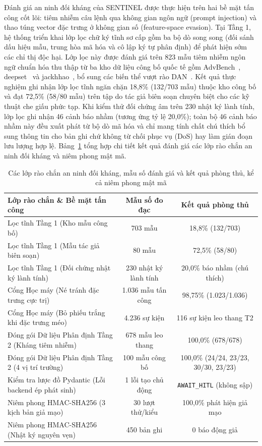 Đánh giá an ninh đối kháng của SENTINEL được thực hiện trên hai bề mặt tấn công cốt lõi: tiêm nhiễm câu lệnh qua không gian ngôn ngữ (prompt injection) và thao túng vector đặc trưng ở không gian số (feature-space evasion). Tại Tầng 1, hệ thống triển khai lớp lọc chữ ký tĩnh sơ cấp gồm ba bộ dò song song (đối sánh dấu hiệu mẫu, trung hòa mã hóa và cô lập ký tự phân định) để phát hiện sớm các chỉ thị độc hại. Lớp lọc này được đánh giá trên 823 mẫu tiêm nhiễm ngôn ngữ chuẩn hóa thu thập từ ba kho dữ liệu công bố quốc tế gồm AdvBench~\cite{advbench2023}, deepset~\cite{deepset2023} và jackhhao~\cite{jackhhao2023}, bổ sung các biến thể vượt rào DAN~\cite{shen2024dan}. Kết quả thực nghiệm ghi nhận lớp lọc tĩnh ngăn chặn 18,8\% (132/703 mẫu) thuộc kho công bố và đạt 72,5\% (58/80 mẫu) trên tập do tác giả biên soạn chuyên biệt cho các kỹ thuật che giấu phức tạp. Khi kiểm thử đối chứng âm trên 230 nhật ký lành tính, lớp lọc ghi nhận 46 cảnh báo nhầm (tương ứng tỷ lệ 20,0\%); toàn bộ 46 cảnh báo nhầm này đều xuất phát từ bộ dò mã hóa và chỉ mang tính chất chú thích bổ sung thông tin cho bản ghi chứ không từ chối phục vụ (DoS) hay làm gián đoạn lưu lượng hợp lệ. Bảng~\ref{tab:rq2_security} tổng hợp chi tiết kết quả đánh giá các lớp rào chắn an ninh đối kháng và niêm phong mật mã.

\begin{table}[htbp]
\centering
\caption[Kết quả đánh giá các lớp rào chắn an ninh đối kháng]{Các lớp rào chắn an ninh đối kháng, mẫu số đánh giá và kết quả phòng thủ, kể cả niêm phong mật mã}
\label{tab:rq2_security}
\footnotesize
\setlength{\tabcolsep}{4pt}
\begin{tabularx}{\textwidth}{>{\raggedright\arraybackslash}X c c}
\toprule
\textbf{Lớp rào chắn \& Bề mặt tấn công} & \textbf{Mẫu số đo đạc} & \textbf{Kết quả phòng thủ} \\
\midrule
Lọc tĩnh Tầng 1 (Kho mẫu công bố) & 703 mẫu & 18,8\% (132/703) \\
Lọc tĩnh Tầng 1 (Mẫu tác giả biên soạn) & 80 mẫu & 72,5\% (58/80) \\
Lọc tĩnh Tầng 1 (Đối chứng nhật ký lành tính) & 230 nhật ký lành tính & 20,0\% báo nhầm (chú thích) \\
Cổng Học máy (Né tránh đặc trưng cực trị) & 1.036 mẫu tấn công & 98,75\% (1.023/1.036) \\
Cổng Học máy (Bỏ phiếu trắng khi đặc trưng méo) & 4.236 sự kiện & 116 sự kiện leo thang T2 \\
Đóng gói Dữ liệu Phân định Tầng 2 (Kháng tiêm nhiễm) & 678 mẫu leo thang & 100,0\% (678/678) \\
Đóng gói Dữ liệu Phân định Tầng 2 (4 vị trí trường) & 100 mẫu công bố & 100,0\% (24/24, 23/23, 30/30, 23/23) \\
Kiểm tra lược đồ Pydantic (Lỗi backend ép phát sinh) & 1 lỗi tạo chủ động & \texttt{AWAIT\_HITL} (không sập) \\
Niêm phong HMAC-SHA256 (3 kịch bản giả mạo) & 30 lượt thử/kiểu & 100,0\% phát hiện giả mạo \\
Niêm phong HMAC-SHA256 (Nhật ký nguyên vẹn) & 450 bản ghi & 0 báo động giả \\
\bottomrule
\end{tabularx}
\end{table}

